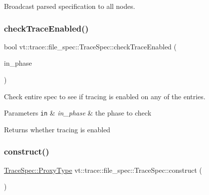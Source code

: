 Broadcast parsed specification to all nodes. 

\mbox{\label{structvt_1_1trace_1_1file__spec_1_1_trace_spec_adf331a01f94b57cb9229c89311f1bcda}} 
\subsubsection{\texorpdfstring{check\+Trace\+Enabled()}{checkTraceEnabled()}}
{\footnotesize\ttfamily bool vt\+::trace\+::file\+\_\+spec\+::\+Trace\+Spec\+::check\+Trace\+Enabled (\begin{DoxyParamCaption}\item[{\hyperlink{structvt_1_1trace_1_1file__spec_1_1_trace_spec_a4dd2e8fb971930351812d0f286baece2}{Spec\+Index}}]{in\+\_\+phase }\end{DoxyParamCaption})}



Check entire spec to see if tracing is enabled on any of the entries. 


\begin{DoxyParams}[1]{Parameters}
\mbox{\tt in}  & {\em in\+\_\+phase} & the phase to check\\
\hline
\end{DoxyParams}
\begin{DoxyReturn}{Returns}
whether tracing is enabled 
\end{DoxyReturn}
\mbox{\label{structvt_1_1trace_1_1file__spec_1_1_trace_spec_a66e362b05b4af9a4e4ef514a4e272599}} 
\subsubsection{\texorpdfstring{construct()}{construct()}}
{\footnotesize\ttfamily \hyperlink{structvt_1_1trace_1_1file__spec_1_1_trace_spec_a26160cff9bb5115866943ed823405f1f}{Trace\+Spec\+::\+Proxy\+Type} vt\+::trace\+::file\+\_\+spec\+::\+Trace\+Spec\+::construct (\begin{DoxyParamCaption}{ }\end{DoxyParamCaption})\hspace{0.3cm}{\ttfamily [static]}}



